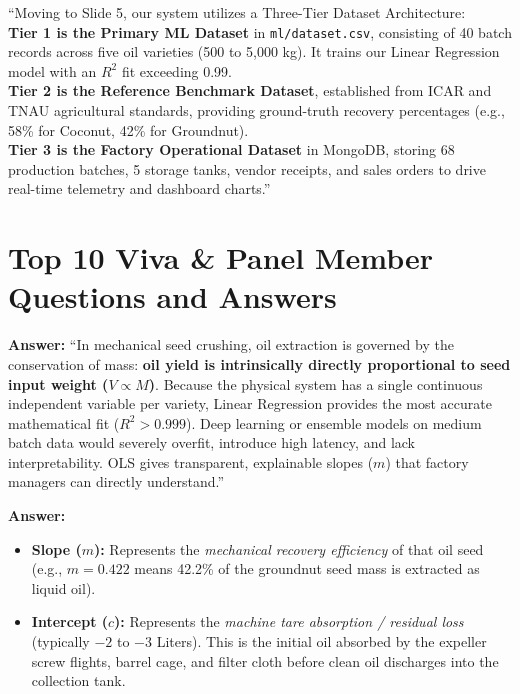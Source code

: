 \documentclass[11pt,a4paper]{article}
\begin{document}
\begin{speechbox}
``Moving to Slide 5, our system utilizes a Three-Tier Dataset Architecture:\\
\textbf{Tier 1 is the Primary ML Dataset} in \texttt{ml/dataset.csv}, consisting of 40 batch records across five oil varieties (500 to 5,000 kg). It trains our Linear Regression model with an $R^2$ fit exceeding 0.99.\\
\textbf{Tier 2 is the Reference Benchmark Dataset}, established from ICAR and TNAU agricultural standards, providing ground-truth recovery percentages (e.g., 58\% for Coconut, 42\% for Groundnut).\\
\textbf{Tier 3 is the Factory Operational Dataset} in MongoDB, storing 68 production batches, 5 storage tanks, vendor receipts, and sales orders to drive real-time telemetry and dashboard charts.''
\end{speechbox}

\newpage

\section{Top 10 Viva \& Panel Member Questions and Answers}

\begin{qabox}
\textbf{Answer:} ``In mechanical seed crushing, oil extraction is governed by the conservation of mass: \textbf{oil yield is intrinsically directly proportional to seed input weight ($V \propto M$)}. Because the physical system has a single continuous independent variable per variety, Linear Regression provides the most accurate mathematical fit ($R^2 > 0.999$). Deep learning or ensemble models on medium batch data would severely overfit, introduce high latency, and lack interpretability. OLS gives transparent, explainable slopes ($m$) that factory managers can directly understand.''
\end{qabox}

\begin{qabox}[Q2: What do the slope ($m$) and intercept ($c$) represent physically in your formula $y = mx + c$?]
\textbf{Answer:}
\begin{itemize}[leftmargin=1.2em]
    \item \textbf{Slope ($m$):} Represents the \textit{mechanical recovery efficiency} of that oil seed (e.g., $m = 0.422$ means 42.2\% of the groundnut seed mass is extracted as liquid oil).
    \item \textbf{Intercept ($c$):} Represents the \textit{machine tare absorption / residual loss} (typically $-2$ to $-3$ Liters). This is the initial oil absorbed by the expeller screw flights, barrel cage, and filter cloth before clean oil discharges into the collection tank.
\end{itemize}
\end{qabox}
\end{document}
